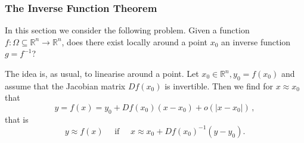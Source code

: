 %
%
%
%  
%
%  

 \begin{frame}[fragile] \frametitle{The Inverse Function Theorem}


In this section we consider the following problem. Given a function
  $f\colon \Omega \subseteq \mathbb{R}^n \rightarrow \mathbb{R}^n$, does there exist
  locally around a point $x_0$ an inverse function
       $g = f^{-1}$?

The idea is, as usual, to linearise around a point.
	  Let  $x_0 \in \mathbb{R}^n , y_0 = f(x_0)$ and assume that the Jacobian matrix $D f(x_0)$
	  is invertible. Then we find for 
	     $x \approx x_0$ that 
	        \[y = f(x) = y_0 + D f(x_0)(x - x_0) + o(|x-x_0|)\,,\]
		    that is \[
		      y \approx f(x)
		        \quad \text{ if } \quad
			  x \approx x_0 + D f(x_0)^{-1} (y - y_0).
			    \]

		
\end{frame}
		
 



